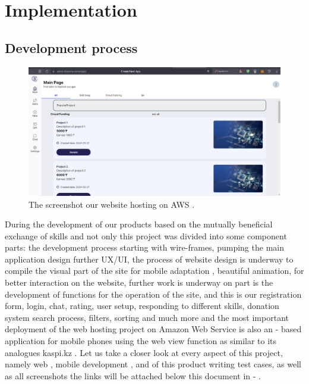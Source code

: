 \chapter{Implementation}\label{ch:D}
\section{Development process}\label{devprc}
\begin{figure}[ht]\label{fig:market}
  \centering
  \includegraphics[width=0.8\linewidth]{figures/Website.png}
  \caption{The screenshot our website hosting on AWS \cite{aws}.}
\end{figure}

\hspace*{1cm} During the development of our products based on the mutually beneficial exchange of skills and not only this project was divided into some component parts: the  development process starting with wire-frames, pumping the main application design further UX/UI, the process of website design is underway to compile the visual part of the site for mobile adaptation , beautiful animation, for better interaction on the website, further work is underway on  part is the development of functions for the operation of the site, and this is our registration form, login, chat, rating, user setup, responding to different skills, donation system search process, filters, sorting and much more and the most important deployment of the web hosting project on Amazon Web Service \cite{aws}  is also an  - based application for mobile phones using the web view function as similar to its analogues kaspi.kz \cite{kaspi}. Let us take a closer look at every aspect of this project, namely web , mobile development , and  of this product writing test cases, as well as all screenshots the links will be attached below this document in -  .

\newpage
